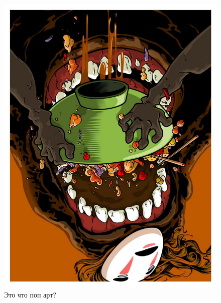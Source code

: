 \documentclass[12pt, a4paper]{article}
\begin{document}
\begin{figure}[h!]
\begin{minipage}[h!]{0.3\linewidth}
\end{minipage}
\hfill
\begin{minipage}[h!]{0.3\linewidth} 
\includegraphics[width=0.8\linewidth, angle=180]{pop6.pdf}
\end{minipage}
\caption{Это что поп арт?}
\end{figure}
\end{document}
